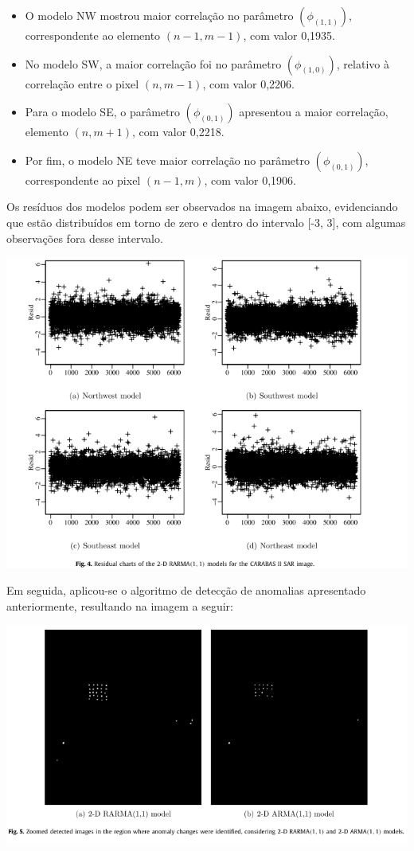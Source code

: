\documentclass[
]{article}
\begin{document}
\begin{itemize}

  \item O modelo NW mostrou maior correlação no parâmetro $(\phi_{(1,1)})$, correspondente ao elemento $(n-1, m-1)$, com valor 0,1935.

  \item No modelo SW, a maior correlação foi no parâmetro $(\phi_{(1,0)})$, relativo à correlação entre o pixel $(n, m-1)$, com valor 0,2206.  

  \item Para o modelo SE, o parâmetro $(\phi_{(0,1)})$ apresentou a maior correlação, elemento $(n, m+1)$, com valor 0,2218.

  \item Por fim, o modelo NE teve maior correlação no parâmetro $(\phi_{(0,1)})$, correspondente ao pixel $(n-1, m)$, com valor 0,1906.

\end{itemize}

Os resíduos dos modelos podem ser observados na imagem abaixo, evidenciando que estão distribuídos em torno de zero e dentro do intervalo {[}-3, 3{]}, com algumas observações fora desse intervalo.

\begin{center}\includegraphics[width=0.7\linewidth]{fig_04} \end{center}

Em seguida, aplicou-se o algoritmo de detecção de anomalias apresentado anteriormente, resultando na imagem a seguir:

\begin{center}\includegraphics[width=0.7\linewidth]{fig_05} \end{center}
\end{document}
